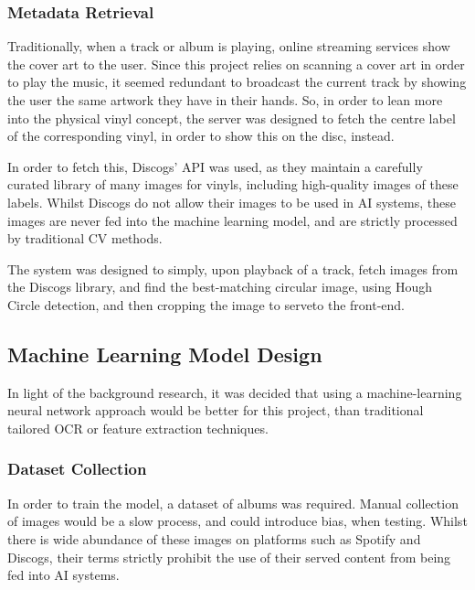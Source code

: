             \subsubsection{Metadata Retrieval}
    
                Traditionally, when a track or album is playing, online streaming services show the cover art to the user. Since this project relies on scanning a cover art in order to play the music, it seemed redundant to broadcast the current track by showing the user the same artwork they have in their hands. So, in order to lean more into the physical vinyl concept, the server was designed to fetch the centre label of the corresponding vinyl, in order to show this on the disc, instead.
    
                In order to fetch this, Discogs' API was used, as they maintain a carefully curated library of many images for vinyls, including high-quality images of these labels. Whilst Discogs do not allow their images to be used in AI systems, these images are never fed into the machine learning model, and are strictly processed by traditional CV methods.
    
                The system was designed to simply, upon playback of a track, fetch images from the Discogs library, and find the best-matching circular image, using Hough Circle detection, and then cropping the image to serveto the front-end.
          
        \subsection{Machine Learning Model Design} \label{sec:mlDesign}
    
            In light of the background research, it was decided that using a machine-learning neural network approach would be better for this project, than traditional tailored OCR or feature extraction techniques.
        
            \subsubsection{Dataset Collection}
    
                In order to train the model, a dataset of albums was required. Manual collection of images would be a slow process, and could introduce bias, when testing. Whilst there is wide abundance of these images on platforms such as Spotify and Discogs, their terms strictly prohibit the use of their served content from being fed into AI systems.
    
